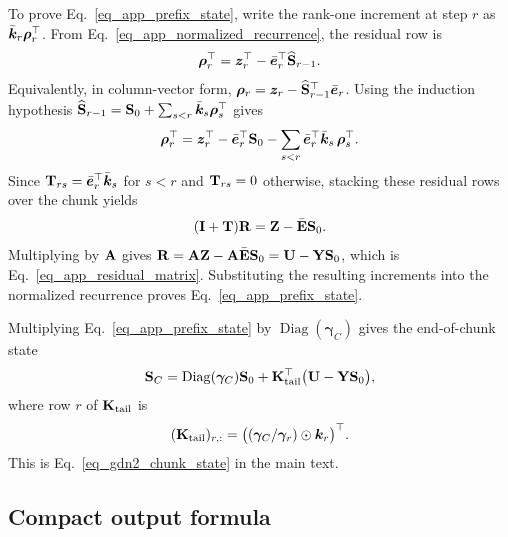 To prove Eq.~\ref{eq_app_prefix_state}, write the rank-one increment at step $r$ as $\bar{{\bm{k}}}_r\boldsymbol{\rho}_r^\top$. From Eq.~\ref{eq_app_normalized_recurrence}, the residual row is
\begin{align}
    \boldsymbol{\rho}_r^\top
    =
    {\bm{z}}_r^\top
    -
    \bar{{\bm{e}}}_r^\top\widehat{{\mathbf{S}}}_{r-1}.
\label{eq_app_residual_row}
\end{align}
Equivalently, in column-vector form, $\boldsymbol{\rho}_r={\bm{z}}_r-\widehat{{\mathbf{S}}}_{r-1}^{\top}\bar{{\bm{e}}}_r$. Using the induction hypothesis $\widehat{{\mathbf{S}}}_{r-1}={\mathbf{S}}_0+\sum_{s<r}\bar{{\bm{k}}}_s\boldsymbol{\rho}_s^\top$ gives
\begin{align}
    \boldsymbol{\rho}_r^\top
    =
    {\bm{z}}_r^\top
    -
    \bar{{\bm{e}}}_r^\top{\mathbf{S}}_0
    -
    \sum_{s<r}
    \bar{{\bm{e}}}_r^\top\bar{{\bm{k}}}_s\,\boldsymbol{\rho}_s^\top .
\label{eq_app_residual_row_expanded}
\end{align}
Since ${\mathbf{T}}_{rs}=\bar{{\bm{e}}}_r^\top\bar{{\bm{k}}}_s$ for $s<r$ and ${\mathbf{T}}_{rs}=0$ otherwise, stacking these residual rows over the chunk yields
\begin{align}
    ({\mathbf{I}}+{\mathbf{T}}){\mathbf{R}}
    =
    {\mathbf{Z}}-\bar{{\mathbf{E}}}{\mathbf{S}}_0 .
\label{eq_app_residual_linear_system}
\end{align}
Multiplying by ${\mathbf{A}}$ gives ${\mathbf{R}}={\mathbf{A}}{\mathbf{Z}}-{\mathbf{A}}\bar{{\mathbf{E}}}{\mathbf{S}}_0={\mathbf{U}}-{\mathbf{Y}}{\mathbf{S}}_0$, which is Eq.~\ref{eq_app_residual_matrix}. Substituting the resulting increments into the normalized recurrence proves Eq.~\ref{eq_app_prefix_state}.

Multiplying Eq.~\ref{eq_app_prefix_state} by $\operatorname{Diag}(\boldsymbol{\gamma}_C)$ gives the end-of-chunk state
\begin{align}
    {\mathbf{S}}_C
    =
    \operatorname{Diag}(\boldsymbol{\gamma}_C){\mathbf{S}}_0
    +
    {\mathbf{K}}_{\mathrm{tail}}^\top
    \bigl({\mathbf{U}}-{\mathbf{Y}}{\mathbf{S}}_0\bigr),
\label{eq_app_chunk_state}
\end{align}
where row $r$ of ${\mathbf{K}}_{\mathrm{tail}}$ is
\begin{align}
    ({\mathbf{K}}_{\mathrm{tail}})_{r,:}
    =
    \bigl((\boldsymbol{\gamma}_C/\boldsymbol{\gamma}_r)
    \odot {\bm{k}}_r\bigr)^\top .
\label{eq_app_ktail}
\end{align}
This is Eq.~\ref{eq_gdn2_chunk_state} in the main text.

\subsection{Compact output formula}
\label{app_output_formula}

